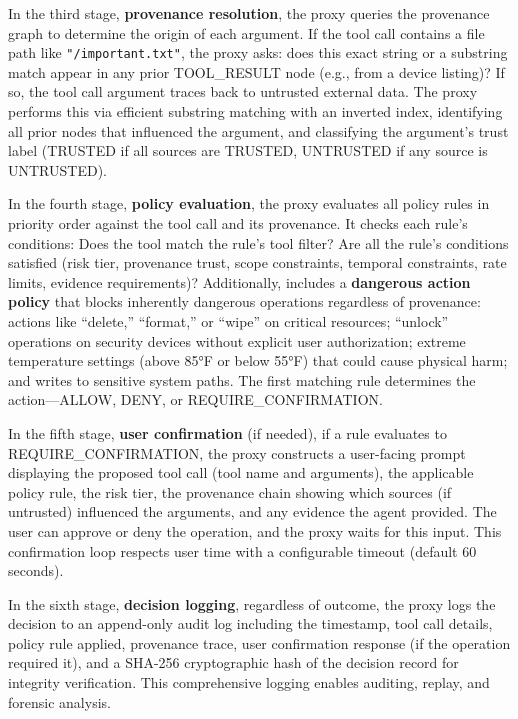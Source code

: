 In the third stage, \textbf{provenance resolution}, the proxy queries the provenance graph to determine the origin of each argument. If the tool call contains a file path like \texttt{"/important.txt"}, the proxy asks: does this exact string or a substring match appear in any prior TOOL\_RESULT node (e.g., from a device listing)? If so, the tool call argument traces back to untrusted external data. The proxy performs this via efficient substring matching with an inverted index, identifying all prior nodes that influenced the argument, and classifying the argument's trust label (TRUSTED if all sources are TRUSTED, UNTRUSTED if any source is UNTRUSTED).

In the fourth stage, \textbf{policy evaluation}, the proxy evaluates all policy rules in priority order against the tool call and its provenance. It checks each rule's conditions: Does the tool match the rule's tool filter? Are all the rule's conditions satisfied (risk tier, provenance trust, scope constraints, temporal constraints, rate limits, evidence requirements)? Additionally, \sys{} includes a \textbf{dangerous action policy} that blocks inherently dangerous operations regardless of provenance: actions like ``delete,'' ``format,'' or ``wipe'' on critical resources; ``unlock'' operations on security devices without explicit user authorization; extreme temperature settings (above 85°F or below 55°F) that could cause physical harm; and writes to sensitive system paths. The first matching rule determines the action—ALLOW, DENY, or REQUIRE\_CONFIRMATION.

In the fifth stage, \textbf{user confirmation} (if needed), if a rule evaluates to REQUIRE\_CONFIRMATION, the proxy constructs a user-facing prompt displaying the proposed tool call (tool name and arguments), the applicable policy rule, the risk tier, the provenance chain showing which sources (if untrusted) influenced the arguments, and any evidence the agent provided. The user can approve or deny the operation, and the proxy waits for this input. This confirmation loop respects user time with a configurable timeout (default 60 seconds).

In the sixth stage, \textbf{decision logging}, regardless of outcome, the proxy logs the decision to an append-only audit log including the timestamp, tool call details, policy rule applied, provenance trace, user confirmation response (if the operation required it), and a SHA-256 cryptographic hash of the decision record for integrity verification. This comprehensive logging enables auditing, replay, and forensic analysis.


